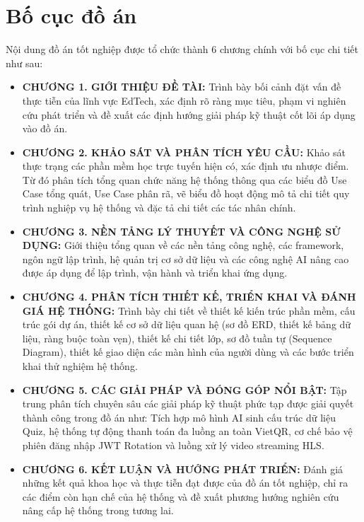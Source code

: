 \documentclass[../main.tex]{subfiles}
\begin{document}
\section{Bố cục đồ án}
\label{sec:BoCucDoAn}

Nội dung đồ án tốt nghiệp được tổ chức thành 6 chương chính với bố cục chi tiết như sau:

\begin{itemize}
    \item \textbf{CHƯƠNG 1. GIỚI THIỆU ĐỀ TÀI:} Trình bày bối cảnh đặt vấn đề thực tiễn của lĩnh vực EdTech, xác định rõ ràng mục tiêu, phạm vi nghiên cứu phát triển và đề xuất các định hướng giải pháp kỹ thuật cốt lõi áp dụng vào đồ án.
    \item \textbf{CHƯƠNG 2. KHẢO SÁT VÀ PHÂN TÍCH YÊU CẦU:} Khảo sát thực trạng các phần mềm học trực tuyến hiện có, xác định ưu nhược điểm. Từ đó phân tích tổng quan chức năng hệ thống thông qua các biểu đồ Use Case tổng quát, Use Case phân rã, vẽ biểu đồ hoạt động mô tả chi tiết quy trình nghiệp vụ hệ thống và đặc tả chi tiết các tác nhân chính.
    \item \textbf{CHƯƠNG 3. NỀN TẢNG LÝ THUYẾT VÀ CÔNG NGHỆ SỬ DỤNG:} Giới thiệu tổng quan về các nền tảng công nghệ, các framework, ngôn ngữ lập trình, hệ quản trị cơ sở dữ liệu và các công nghệ AI nâng cao được áp dụng để lập trình, vận hành và triển khai ứng dụng.
    \item \textbf{CHƯƠNG 4. PHÂN TÍCH THIẾT KẾ, TRIỂN KHAI VÀ ĐÁNH GIÁ HỆ THỐNG:} Trình bày chi tiết về thiết kế kiến trúc phần mềm, cấu trúc gói dự án, thiết kế cơ sở dữ liệu quan hệ (sơ đồ ERD, thiết kế bảng dữ liệu, ràng buộc toàn vẹn), thiết kế chi tiết lớp, sơ đồ tuần tự (Sequence Diagram), thiết kế giao diện các màn hình của người dùng và các bước triển khai thử nghiệm hệ thống.
    \item \textbf{CHƯƠNG 5. CÁC GIẢI PHÁP VÀ ĐÓNG GÓP NỔI BẬT:} Tập trung phân tích chuyên sâu các giải pháp kỹ thuật phức tạp được giải quyết thành công trong đồ án như: Tích hợp mô hình AI sinh cấu trúc dữ liệu Quiz, hệ thống tự động thanh toán đa luồng an toàn VietQR, cơ chế bảo vệ phiên đăng nhập JWT Rotation và luồng xử lý video streaming HLS.
    \item \textbf{CHƯƠNG 6. KẾT LUẬN VÀ HƯỚNG PHÁT TRIỂN:} Đánh giá những kết quả khoa học và thực tiễn đạt được của đồ án tốt nghiệp, chỉ ra các điểm còn hạn chế của hệ thống và đề xuất phương hướng nghiên cứu nâng cấp hệ thống trong tương lai.
\end{itemize}
\end{document}
